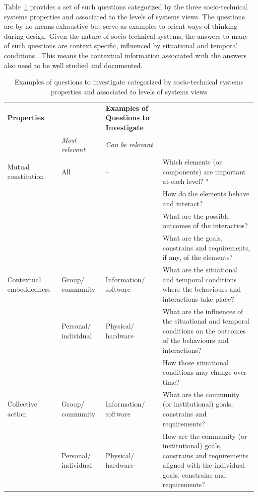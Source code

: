 Table~\ref{tab:questions} provides a set of such questions categorized by the three socio-technical systems properties and associated to the levels of systems views. The questions are by no means exhaustive but serve as examples to orient ways of thinking during design. 
Given the nature of socio-technical systems, the answers to many of such questions are context specific, influenced by situational and temporal conditions \cite{Baxter2011,Norman2015}. This means the contextual information associated with the answers also need to be well studied and documented. 
% 
\begin{table}
\caption{Examples of questions to investigate categorized by socio-technical systems properties and associated to levels of systems views }
\label{tab:questions}       %
%
%
\begin{tabular}{>{\raggedright}p{2cm}>{\raggedright}p{1.6cm}>{\raggedright}p{1.7cm}p{6.2cm}}
\hline\noalign{\smallskip}
\textbf{Properties}  & \multicolumn{2}{l}{\textbf{Relevant Levels of Views}} &   \textbf{Examples of Questions to Investigate} \\
  &   \textit{Most relevant} & \textit{Can be relevant} &  \\
\noalign{\smallskip}\svhline\noalign{\smallskip}
Mutual constitution & All & -- & Which elements (or components) are important at each level? $^a$  \\
 &   &  & How do the elements behave and interact?\\
  &   &  & What are the possible outcomes of the interactios?\\
  &   &  & What are the goals, constrains and requirements, if any, of the elements?\\ \hline\noalign{\smallskip}
Contextual embeddedness &   Group/ community &  Information/ software & What are the situational and temporal conditions where the behaviours and interactions take place? \\
 &   Personal/ individual &  Physical/ hardware & What are the influences of  the situational and temporal conditions on the outcomes of the behaviours and interactions?\\
 &     &    & How those situational conditions may change over time?\\ \hline\noalign{\smallskip}
Collective action   & Group/ community  &  Information/ software & What are the community (or institutional) goals, constrains and requirements?\\
   &  Personal/ individual  & Physical/ hardware & How are the community (or institutional) goals, constrains and requirements aligned with the individual goals, constrains and requirements? \\

\end{tabular}
\end{table}
